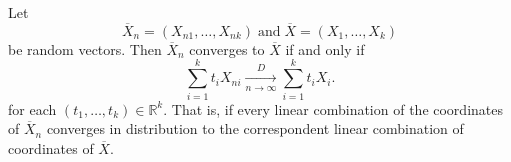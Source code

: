 \documentclass[12pt]{article}
\begin{document}
Let 
\[\overline{X}_n = (X_{n1},\dots,X_{nk}) \;\mbox{and} \; 
\overline{X} = (X_1,\dots,X_k)\]
be  random vectors. Then $\overline{X}_n$ converges to $\overline{X}$  if and only if
\[\sum_{i=1}^k t_iX_{ni} \xrightarrow[n\rightarrow\infty]{D} 
\sum_{i=1}^k t_iX_i.\]
for each $(t_1,\dots,t_k)\in \mathbb{R}^k$. That is, if every 
 linear combination of the coordinates of $\overline{X}_n$ converges in distribution to the correspondent linear combination of coordinates of $\overline{X}$.
\end{document}

